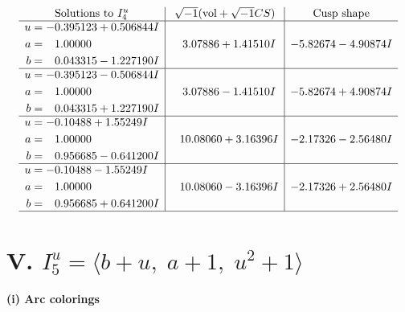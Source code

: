 \documentclass[1p]{elsarticle_modified}
\theoremstyle{definition}
\newcommand{\I}{\sqrt{-1}}
\begin{document}
$$\begin{array}{c|c|c}  
\text{Solutions to }I^u_{4}& \I (\text{vol} + \sqrt{-1}CS) & \text{Cusp shape}\\
 \hline 
\begin{aligned}
u &= -0.395123 + 0.506844 I \\
a &= \phantom{-}1.00000\phantom{ +0.000000I} \\
b &= \phantom{-}0.043315 - 1.227190 I\end{aligned}
 & \phantom{-}3.07886 + 1.41510 I & -5.82674 - 4.90874 I \\ \hline\begin{aligned}
u &= -0.395123 - 0.506844 I \\
a &= \phantom{-}1.00000\phantom{ +0.000000I} \\
b &= \phantom{-}0.043315 + 1.227190 I\end{aligned}
 & \phantom{-}3.07886 - 1.41510 I & -5.82674 + 4.90874 I \\ \hline\begin{aligned}
u &= -0.10488 + 1.55249 I \\
a &= \phantom{-}1.00000\phantom{ +0.000000I} \\
b &= \phantom{-}0.956685 - 0.641200 I\end{aligned}
 & \phantom{-}10.08060 + 3.16396 I & -2.17326 - 2.56480 I \\ \hline\begin{aligned}
u &= -0.10488 - 1.55249 I \\
a &= \phantom{-}1.00000\phantom{ +0.000000I} \\
b &= \phantom{-}0.956685 + 0.641200 I\end{aligned}
 & \phantom{-}10.08060 - 3.16396 I & -2.17326 + 2.56480 I\\
 \hline 
 \end{array}$$\newpage\newpage\renewcommand{\arraystretch}{1}
\centering \section*{V. $I^u_{5}= \langle b+u,\;a+1,\;u^2+1 \rangle$}
\flushleft \textbf{(i) Arc colorings}\\
\end{document}
